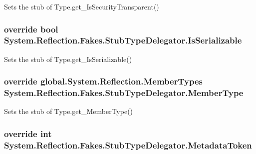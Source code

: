 Sets the stub of Type.\-get\-\_\-\-Is\-Security\-Transparent()

\hypertarget{class_system_1_1_reflection_1_1_fakes_1_1_stub_type_delegator_a91d9646fce1cceacebb140a1b7595aea}{
\subsubsection[{Is\-Serializable}]{\setlength{\rightskip}{0pt plus 5cm}override bool System.\-Reflection.\-Fakes.\-Stub\-Type\-Delegator.\-Is\-Serializable\hspace{0.3cm}{\ttfamily [get]}}}\label{class_system_1_1_reflection_1_1_fakes_1_1_stub_type_delegator_a91d9646fce1cceacebb140a1b7595aea}


Sets the stub of Type.\-get\-\_\-\-Is\-Serializable()

\hypertarget{class_system_1_1_reflection_1_1_fakes_1_1_stub_type_delegator_a710ac251ca27387880d2a4370d748127}{
\subsubsection[{Member\-Type}]{\setlength{\rightskip}{0pt plus 5cm}override global.\-System.\-Reflection.\-Member\-Types System.\-Reflection.\-Fakes.\-Stub\-Type\-Delegator.\-Member\-Type\hspace{0.3cm}{\ttfamily [get]}}}\label{class_system_1_1_reflection_1_1_fakes_1_1_stub_type_delegator_a710ac251ca27387880d2a4370d748127}


Sets the stub of Type.\-get\-\_\-\-Member\-Type()

\hypertarget{class_system_1_1_reflection_1_1_fakes_1_1_stub_type_delegator_af31d06150bec22be8ecb4f6c92f59544}{
\subsubsection[{Metadata\-Token}]{\setlength{\rightskip}{0pt plus 5cm}override int System.\-Reflection.\-Fakes.\-Stub\-Type\-Delegator.\-Metadata\-Token\hspace{0.3cm}{\ttfamily [get]}}}\label{class_system_1_1_reflection_1_1_fakes_1_1_stub_type_delegator_af31d06150bec22be8ecb4f6c92f59544}


